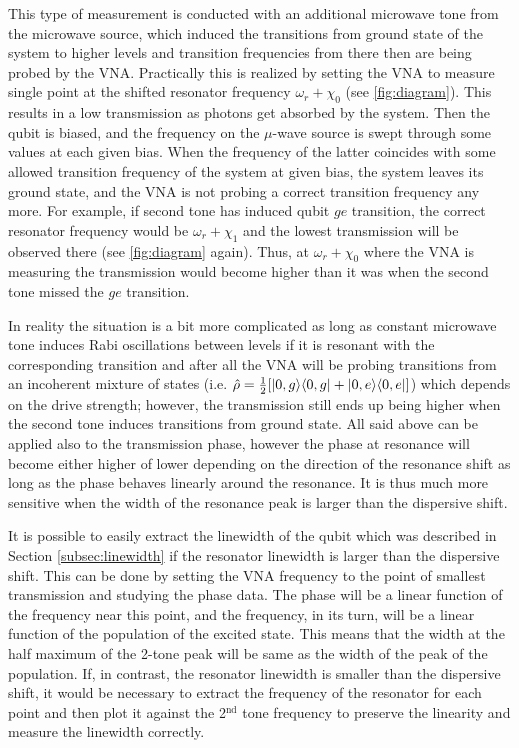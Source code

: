 \documentclass[12pt, twoside]{report}
\DeclarePairedDelimiter\bra{\langle}{\rvert}
\DeclarePairedDelimiter\ket{\lvert}{\rangle}
\numberwithin{equation}{section}
\begin{document}
This type of measurement is conducted with an additional microwave tone from the microwave source, which induced the transitions from ground state of the system to higher levels and transition frequencies from there then are being probed by the VNA. Practically this is realized by setting the VNA to measure single point at the shifted resonator  frequency $\omega_r + \chi_0$ (see \autoref{fig:diagram}). This results in a low transmission as photons get absorbed by the system. Then the qubit is biased, and the frequency on the $\mu$-wave source is swept through some values at each given bias. When the frequency of the latter coincides with some allowed transition frequency of the system at given bias, the system leaves its ground state, and the VNA is not probing a correct transition frequency any more. For example, if second tone has induced qubit $ge$ transition, the correct resonator frequency would be $\omega_r + \chi_1$ and the lowest transmission will be observed there (see \autoref{fig:diagram} again). Thus, at $\omega_r + \chi_0$ where the VNA is measuring the transmission would become higher than it was when the second tone missed the $ge$ transition. 

In reality the situation is a bit more complicated as long as constant microwave tone induces Rabi oscillations between levels if it is resonant with the corresponding transition and after all the VNA will be probing transitions from an incoherent mixture of states (i.e. $\hat \rho = \frac{1}{2} [\ket{0, g}\bra{0,g} + \ket{0, e}\bra{0,e}]$) which depends on the drive strength; however, the transmission still ends up being higher when the second tone induces transitions from ground state. All said above can be applied also to the transmission phase, however the phase at resonance will become either higher of lower depending on the direction of the resonance shift as long as the phase behaves linearly around the resonance. It is thus much more sensitive when the width of the resonance peak is larger than the dispersive shift. 

It is possible to easily extract the linewidth of the qubit which was described in Section \ref{subsec:linewidth} if the resonator linewidth is larger than the dispersive shift. This can be done by setting the VNA frequency to the point of smallest transmission and studying the phase data. The phase will be a linear function of the frequency near this point, and the frequency, in its turn, will be a linear function of the population of the excited state. This means that the width at the half maximum of the 2-tone peak will be same as the width of the peak of the population. If, in contrast, the resonator linewidth is smaller than the dispersive shift, it would be necessary to extract the frequency of the resonator for each point and then plot it against the 2$^{\text{nd}}$ tone frequency to preserve the linearity and measure the linewidth correctly.
\end{document}
